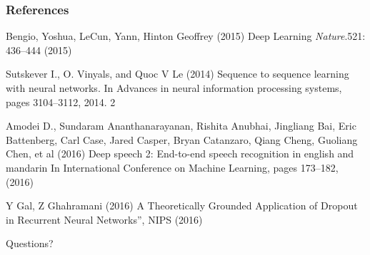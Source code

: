 \documentclass{beamer}
\begin{document}
\begin{frame}
\frametitle{References}
\footnotesize{
\begin{thebibliography}{99} 
 Bengio, Yoshua, LeCun, Yann, Hinton Geoffrey (2015)
\newblock Deep Learning
\newblock \emph{Nature}.521: 436–444 (2015)

 Sutskever I., O. Vinyals, and Quoc V Le (2014)
\newblock Sequence to sequence learning with neural networks.
\newblock In Advances in neural information processing systems, pages 3104–3112, 2014. 2

Amodei D., Sundaram Ananthanarayanan, Rishita Anubhai, Jingliang Bai, Eric Battenberg, Carl Case, Jared Casper, Bryan Catanzaro, Qiang Cheng, Guoliang Chen, et al (2016)
\newblock Deep speech 2: End-to-end speech recognition in english and mandarin
\newblock In International Conference on Machine Learning, pages 173–182, (2016)

 Y Gal, Z Ghahramani (2016) 
\newblock A Theoretically Grounded Application of Dropout in
\newblock Recurrent Neural Networks”, NIPS (2016)


\end{thebibliography}
}
\end{frame}

\begin{frame}
\Huge{\centerline{Questions?}}
\end{frame}
\end{document}
